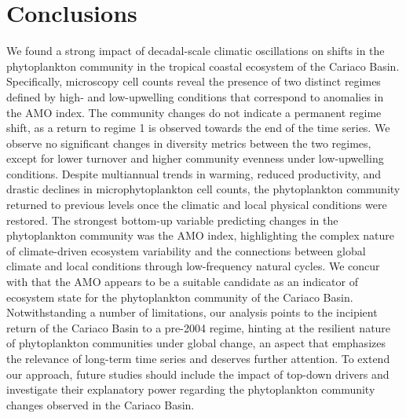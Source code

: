 \documentclass[draft]{agujournal2019}
\begin{document}
\section{Conclusions}
We found a strong impact of decadal-scale climatic oscillations on shifts in the phytoplankton community in the tropical coastal ecosystem of the Cariaco Basin. Specifically, microscopy cell counts reveal the presence of two distinct regimes defined by high- and low-upwelling conditions that correspond to anomalies in the AMO index. The community changes do not indicate a permanent regime shift, as a return to regime 1 is observed towards the end of the time series. We observe no significant changes in diversity metrics between the two regimes, except for lower turnover and higher community evenness under low-upwelling conditions.
Despite multiannual trends in warming, reduced productivity, and drastic declines in microphytoplankton cell counts, the phytoplankton community returned to previous levels once the climatic and local physical conditions were restored. 
The strongest bottom-up variable predicting changes in the phytoplankton community was the AMO index, highlighting the complex nature of climate-driven ecosystem variability and the connections between global climate and local conditions through low-frequency natural cycles. We concur with  that the AMO appears to be a suitable candidate as an indicator of ecosystem state for the phytoplankton community of the Cariaco Basin. 
Notwithstanding a number of limitations, our analysis points to the incipient return of the Cariaco Basin to a pre-2004 regime, hinting at the resilient nature of phytoplankton communities under global change, an aspect that emphasizes the relevance of long-term time series and deserves further attention. 
To extend our approach, future studies should include the impact of top-down drivers and investigate their explanatory power regarding the phytoplankton community changes observed in the Cariaco Basin.









%
%
\end{document}
